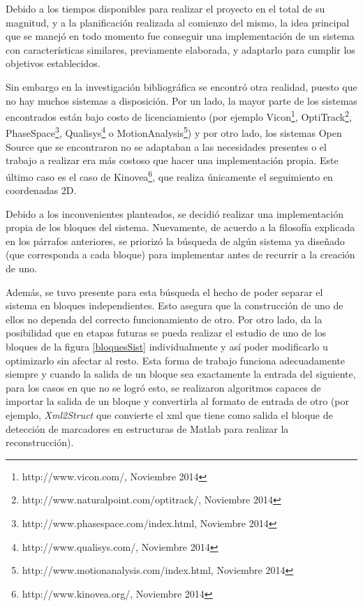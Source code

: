 Debido a los tiempos disponibles para realizar el proyecto en el total de su magnitud, y a la planificación realizada al comienzo del mismo, la idea principal que se manejó en todo momento fue conseguir una implementación de un sistema con características similares, previamente elaborada, y adaptarlo para cumplir los objetivos establecidos. 

Sin embargo en la investigación bibliográfica se encontró otra realidad, puesto que no hay muchos sistemas a disposición. Por un lado, la mayor parte de los sistemas encontrados están bajo costo de licenciamiento (por ejemplo Vicon\footnote{http://www.vicon.com/, Noviembre 2014}, OptiTrack\footnote{http://www.naturalpoint.com/optitrack/, Noviembre 2014}, PhaseSpace\footnote{http://www.phasespace.com/index.html, Noviembre 2014}, Qualisys\footnote{http://www.qualisys.com/, Noviembre 2014} o MotionAnalysis\footnote{http://www.motionanalysis.com/index.html, Noviembre 2014}) y por otro lado, los sistemas Open Source que se encontraron no se adaptaban a las necesidades presentes o el trabajo a realizar era más costoso que hacer una implementación propia. Este último caso es el caso de Kinovea\footnote{http://www.kinovea.org/, Noviembre 2014}, que realiza únicamente el seguimiento en coordenadas 2D.

Debido a los inconvenientes planteados, se decidió realizar una implementación propia de los bloques del sistema. Nuevamente, de acuerdo a la filosofía explicada en los párrafos anteriores, se priorizó la búsqueda de algún sistema ya diseñado (que corresponda a cada bloque) para implementar antes de recurrir a la creación de uno.

Además, se tuvo presente para esta búsqueda el hecho de poder separar el sistema en bloques independientes. Esto asegura que la construcción de uno de ellos no dependa del correcto funcionamiento de otro. Por otro lado, da la posibilidad que en etapas futuras se pueda realizar el estudio de uno de los bloques de la figura \ref{bloquesSist} individualmente y así poder modificarlo u optimizarlo sin afectar al resto. Esta forma de trabajo funciona adecuadamente siempre y cuando la salida de un bloque sea exactamente la entrada del siguiente, para los casos en que no se logró esto, se realizaron algoritmos capaces de importar la salida de un bloque y convertirla al formato de entrada de otro (por ejemplo, \textit{Xml2Struct} que convierte el xml que tiene como salida el bloque de detección de marcadores en estructuras de Matlab para realizar la reconstrucción).

